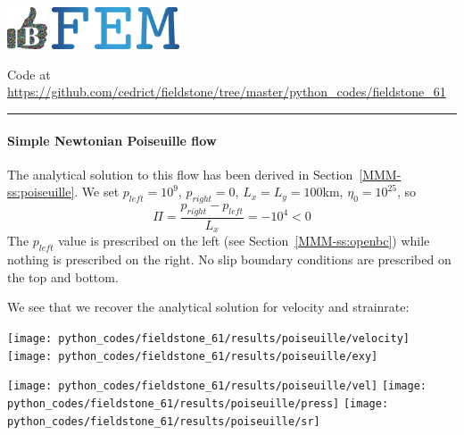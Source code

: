 \includegraphics[height=1.25cm]{images/pictograms/benchmark}
\includegraphics[height=1.25cm]{images/pictograms/FEM}




\begin{center}
Code at \url{https://github.com/cedrict/fieldstone/tree/master/python_codes/fieldstone_61}
\end{center}

\par\noindent\rule{\textwidth}{0.4pt}


\paragraph{Simple Newtonian Poiseuille flow} The analytical solution to this flow has been derived 
in Section~\ref{MMM-ss:poiseuille}.
We set $p_{left}=10^9$, $p_{right}=0$, $L_x=L_y=100$km, $\eta_0=10^{25}$, so 
\[
\Pi=\frac{p_{right}-p_{left}}{L_x}=-10^4 <0
\]
The $p_{left}$ value is prescribed on the left (see Section~\ref{MMM-ss:openbc}) while 
nothing is prescribed on the right. No slip boundary conditions are 
prescribed on the top and bottom.

We see that we recover the analytical solution for velocity and strainrate:
\begin{center}
\texttt{[image: python\_codes/fieldstone\_61/results/poiseuille/velocity]}
\texttt{[image: python\_codes/fieldstone\_61/results/poiseuille/exy]}
\end{center}

\begin{center}
\texttt{[image: python\_codes/fieldstone\_61/results/poiseuille/vel]}
\texttt{[image: python\_codes/fieldstone\_61/results/poiseuille/press]}
\texttt{[image: python\_codes/fieldstone\_61/results/poiseuille/sr]}
\end{center}

